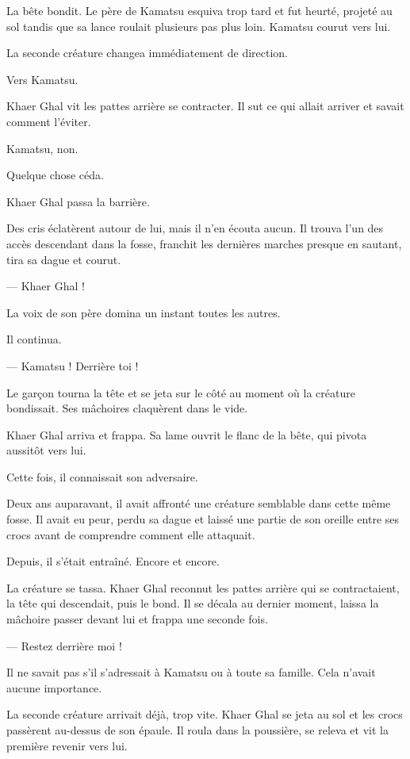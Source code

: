 La bête bondit. Le père de Kamatsu esquiva trop tard et fut heurté, projeté au
sol tandis que sa lance roulait plusieurs pas plus loin. Kamatsu courut vers
lui.

La seconde créature changea immédiatement de direction.

Vers Kamatsu.

Khaer Ghal vit les pattes arrière se contracter. Il sut ce qui allait arriver
et savait comment l'éviter.

Kamatsu, non.

Quelque chose céda.

Khaer Ghal passa la barrière.

\scenebreak

Des cris éclatèrent autour de lui, mais il n'en écouta aucun. Il trouva l'un
des accès descendant dans la fosse, franchit les dernières marches presque en
sautant, tira sa dague et courut.

— Khaer Ghal !

La voix de son père domina un instant toutes les autres.

Il continua.

— Kamatsu ! Derrière toi !

Le garçon tourna la tête et se jeta sur le côté au moment où la créature
bondissait. Ses mâchoires claquèrent dans le vide.

Khaer Ghal arriva et frappa. Sa lame ouvrit le flanc de la bête, qui pivota
aussitôt vers lui.

Cette fois, il connaissait son adversaire.

Deux ans auparavant, il avait affronté une créature semblable dans cette même
fosse. Il avait eu peur, perdu sa dague et laissé une partie de son oreille
entre ses crocs avant de comprendre comment elle attaquait.

Depuis, il s'était entraîné. Encore et encore.

La créature se tassa. Khaer Ghal reconnut les pattes arrière qui se
contractaient, la tête qui descendait, puis le bond. Il se décala au dernier
moment, laissa la mâchoire passer devant lui et frappa une seconde fois.

— Restez derrière moi !

Il ne savait pas s'il s'adressait à Kamatsu ou à toute sa famille. Cela n'avait
aucune importance.

La seconde créature arrivait déjà, trop vite. Khaer Ghal se jeta au sol et les
crocs passèrent au-dessus de son épaule. Il roula dans la poussière, se releva
et vit la première revenir vers lui.

